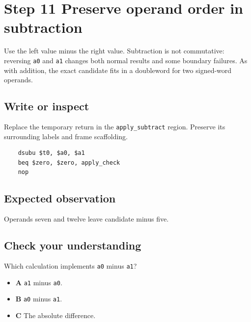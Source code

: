 \section{Step 11 Preserve operand order in subtraction}\label{expression-s11}

Use the left value minus the right value. Subtraction is not commutative: reversing \texttt{a0} and \texttt{a1} changes both normal results and some boundary failures. As with addition, the exact candidate fits in a doubleword for two signed-word operands.

\subsection{Write or inspect}
Replace the temporary return in the \texttt{apply\_subtract} region. Preserve its surrounding labels and frame scaffolding.

\begin{verbatim}
    dsubu $t0, $a0, $a1
    beq $zero, $zero, apply_check
    nop
\end{verbatim}
\subsection{Expected observation}
Operands seven and twelve leave candidate minus five.

\subsection{Check your understanding}
Which calculation implements \texttt{a0} minus \texttt{a1}?

\begin{itemize}
  \item \textbf{A} \texttt{a1} minus \texttt{a0}.
  \item \textbf{B} \texttt{a0} minus \texttt{a1}.
  \item \textbf{C} The absolute difference.
\end{itemize}
